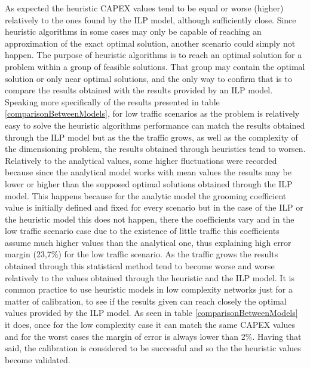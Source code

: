 As expected the heuristic CAPEX values tend to be equal or worse (higher) relatively to the ones found by the ILP model, although sufficiently close. Since heuristic algorithms in some cases may only be capable of reaching an approximation of the exact optimal solution, another scenario could simply not happen. The purpose of heuristic algorithms is to reach an optimal solution for a problem within a group of feasible solutions. That group may contain the optimal solution or only near optimal solutions, and the only way to confirm that is to compare the results obtained with the results provided by an ILP model. %
Speaking more specifically of the results presented in table \ref{comparisonBetweenModels}, for low traffic scenarios as the problem is relatively easy to solve the heuristic algorithms performance can match the results obtained through the ILP model but as the the traffic grows, as well as the complexity of the dimensioning problem, the results obtained through heuristics tend to worsen. Relatively to the analytical values, some higher fluctuations were recorded because since the analytical model works with mean values the results may be lower or higher than the supposed optimal solutions obtained through the ILP model. This happens because for the analytic model the grooming coefficient value is initially defined and fixed for every scenario but in the case of the ILP or the heuristic model this does not happen, there the coefficients vary and in the low traffic scenario case due to the existence of little traffic this coefficients assume much higher values than the analytical one, thus explaining high error margin (23,7\%) for the low traffic scenario. As the traffic grows the results obtained through this statistical method tend to become worse and worse relatively to the values obtained through the heuristic and the ILP model. It is common practice to use heuristic models in low complexity networks just for a matter of calibration, to see if the results given can reach closely the optimal values provided by the ILP model. As seen in table \ref{comparisonBetweenModels} it does, once for the low complexity case it can match the same CAPEX values and for the worst cases the margin of error is always lower than 2\%. Having that said, the calibration is considered to be successful and so the the heuristic values become validated.

